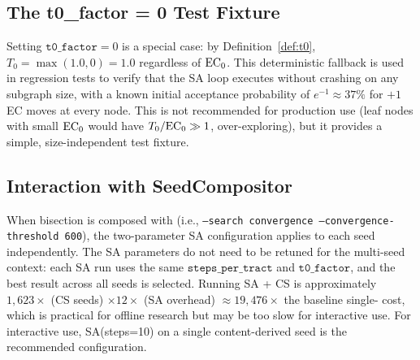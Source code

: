 \subsection{The t0\_factor = 0 Test Fixture}

Setting $\mathtt{t0\_factor} = 0$ is a special case: by Definition~\ref{def:t0},
$T_0 = \max(1.0, 0) = 1.0$ regardless of $\mathrm{EC}_0$.
This deterministic fallback is used in regression tests to verify that the
SA loop executes without crashing on any subgraph size, with a known
initial acceptance probability of $e^{-1} \approx 37\%$ for $+1$ EC moves
at every node.
This is not recommended for production use (leaf nodes with small $\mathrm{EC}_0$
would have $T_0/\mathrm{EC}_0 \gg 1$, over-exploring), but it provides a simple,
size-independent test fixture.

\subsection{Interaction with SeedCompositor}

When \sa{} bisection is composed with \cs{} (i.e.,
\texttt{--search convergence --convergence-threshold 600}), the two-parameter
SA configuration applies to each seed independently.
The SA parameters do not need to be retuned for the multi-seed context:
each SA run uses the same $\mathtt{steps\_per\_tract}$ and
$\mathtt{t0\_factor}$, and the best result across all seeds is selected.
Running SA + CS is approximately $1{,}623 \times$ (CS seeds) $\times 12\times$
(SA overhead) $\approx 19{,}476\times$ the baseline single-\metis{} cost,
which is practical for offline research but may be too slow for interactive
use.
For interactive use, SA(steps=10) on a single content-derived seed is the
recommended configuration.
